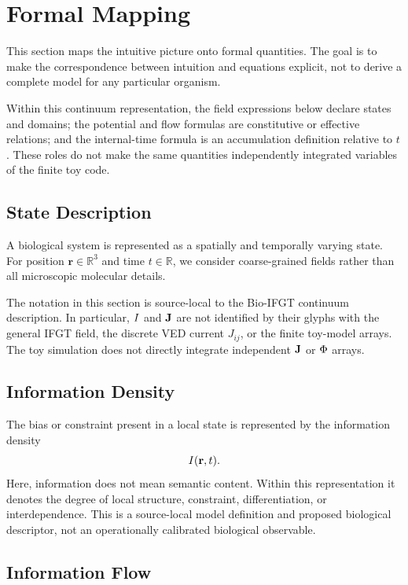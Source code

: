 \section{Formal Mapping}

This section maps the intuitive picture onto formal quantities. The goal is to make the correspondence between intuition and equations explicit, not to derive a complete model for any particular organism.

Within this continuum representation, the field expressions below declare states and domains; the potential and flow formulas are constitutive or effective relations; and the internal-time formula is an accumulation definition relative to \(t\). These roles do not make the same quantities independently integrated variables of the finite toy code.

\subsection{State Description}

A biological system is represented as a spatially and temporally varying state. For position \(\mathbf{r} \in \mathbb{R}^3\) and time \(t \in \mathbb{R}\), we consider coarse-grained fields rather than all microscopic molecular details.

The notation in this section is source-local to the Bio-IFGT continuum description. In particular, \(I\) and \(\mathbf{J}\) are not identified by their glyphs with the general IFGT field, the discrete VED current \(J_{ij}\), or the finite toy-model arrays. The toy simulation does not directly integrate independent \(\mathbf{J}\) or \(\Phi\) arrays.

\subsection{Information Density}

The bias or constraint present in a local state is represented by the information density
\begin{equation}
  I(\mathbf{r},t).
\end{equation}
Here, information does not mean semantic content. Within this representation it denotes the degree of local structure, constraint, differentiation, or interdependence. This is a source-local model definition and proposed biological descriptor, not an operationally calibrated biological observable.

\subsection{Information Flow}


